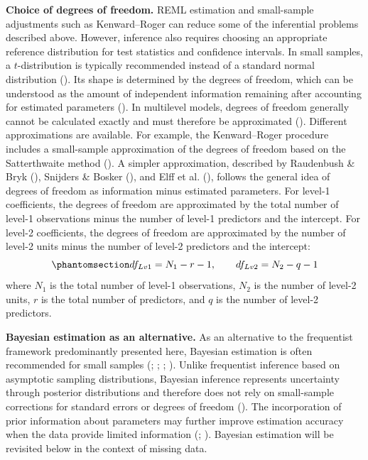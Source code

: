\documentclass[
  letterpaper,
  11pt,
  english,
  singlespacing,
  headsepline,
  openany]{MastersDoctoralThesis}
\begin{document}
\textbf{Choice of degrees of freedom.} REML estimation and small-sample
adjustments such as Kenward--Roger can reduce some of the inferential
problems described above. However, inference also requires choosing an
appropriate reference distribution for test statistics and confidence
intervals. In small samples, a \(t\)-distribution is typically
recommended instead of a standard normal distribution
(). Its shape is
determined by the degrees of freedom, which can be understood as the
amount of independent information remaining after accounting for
estimated parameters (). In
multilevel models, degrees of freedom generally cannot be calculated
exactly and must therefore be approximated
(). Different
approximations are available. For example, the Kenward--Roger procedure
includes a small-sample approximation of the degrees of freedom based on
the Satterthwaite method (). A
simpler approximation, described by Raudenbush \& Bryk
(), Snijders \& Bosker
(), and Elff et al.
(), follows the general idea of degrees of
freedom as information minus estimated parameters. For level-1
coefficients, the degrees of freedom are approximated by the total
number of level-1 observations minus the number of level-1 predictors
and the intercept. For level-2 coefficients, the degrees of freedom are
approximated by the number of level-2 units minus the number of level-2
predictors and the intercept:
\begin{equation}\phantomsection\label{eq-df}{
df_{Lv1} = N_1 - r - 1, \qquad df_{Lv2} = N_2 - q - 1
}\end{equation} where \(N_1\) is the total number of level-1
observations, \(N_2\) is the number of level-2 units, \(r\) is the total
number of predictors, and \(q\) is the number of level-2 predictors.

\textbf{Bayesian estimation as an alternative.} As an alternative to the
frequentist framework predominantly presented here, Bayesian estimation
is often recommended for small samples (; ;
;
). Unlike
frequentist inference based on asymptotic sampling distributions,
Bayesian inference represents uncertainty through posterior
distributions and therefore does not rely on small-sample corrections
for standard errors or degrees of freedom
(). The incorporation of prior
information about parameters may further improve estimation accuracy
when the data provide limited information
(;
). Bayesian estimation will be
revisited below in the context of missing data.
\end{document}
